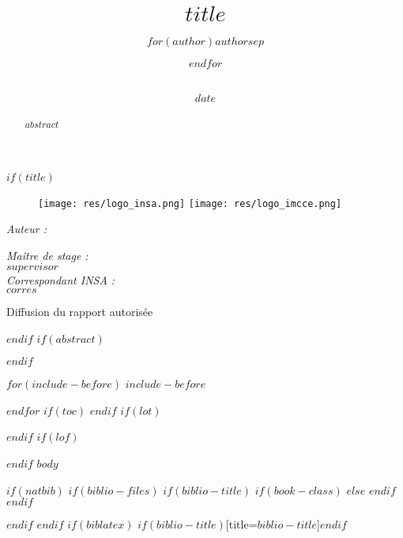 \documentclass[$if(fontsize)$$fontsize$,$endif$$if(lang)$$lang$,$endif$$if(papersize)$$papersize$,$endif$$for(classoption)$$classoption$$sep$,$endfor$]{$documentclass$}
\title{ 
		\HRule{0.5pt} \\ [0.5cm]
        \LARGE \textbf{\uppercase{$title$}}
        \HRule{0.5pt} \\ [0.5cm]
        \vspace*{2\baselineskip}
		}
\author{$for(author)$$author$$sep$ \and $endfor$ \\\vspace{0.5em}{\large $school$} \\\vspace{0.5em}{\large $dpt$}}
\date{$date$}
\makeatletter
\renewcommand*{\maketitle}{
\begin{titlepage}
	\begin{figure}[tbp]\centering
            \texttt{[image: res/logo\_insa.png]}	
        \hfill
            \texttt{[image: res/logo\_imcce.png]}
		\vspace{3cm}
	\end{figure}
	
	\begin{center}
		\@date 
		{\LARGE\@title\unskip\strut\par} \vspace{2cm}

	\begin{minipage}[t]{0.3\textwidth}
	\begin{flushleft} \large
		\emph{Auteur :}\\
		\@author 
	\end{flushleft}
	\end{minipage}
	\begin{minipage}[t]{0.6\textwidth}
	\begin{flushright} \large
		\emph{Maître de stage :} \\
		$supervisor$ \\
		\vspace{1em}
		\emph{Correspondant INSA :} \\
		$corres$
	\end{flushright}
	\end{minipage}

	\vfill

	{\large Diffusion du rapport autorisée}

	\end{center}
	
\end{titlepage}
}
\makeatother
\begin{document}
{}

$if(title)$
\maketitle
$endif$
$if(abstract)$
\begin{abstract}
$abstract$
\end{abstract}
$endif$

$for(include-before)$
$include-before$

{}

$endfor$
$if(toc)$
{
\hypersetup{linkcolor=black}
\setcounter{tocdepth}{$toc-depth$}
\tableofcontents
}
$endif$
$if(lot)$
\listoftables
$endif$
$if(lof)$
\listoffigures
$endif$
$body$

$if(natbib)$
$if(biblio-files)$
$if(biblio-title)$
$if(book-class)$
\renewcommand\bibname{$biblio-title$}
$else$
\renewcommand\refname{$biblio-title$}
$endif$
$endif$


$endif$
$endif$
$if(biblatex)$
\printbibliography$if(biblio-title)$[title=$biblio-title$]$endif$
\end{document}
